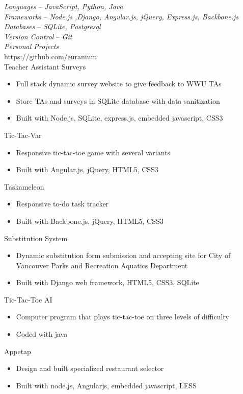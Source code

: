 \documentclass[line,margin]{res}
\begin{document}
\begin{resume}
	{\sl Languages} -- {\sl JavaScript, Python, Java}\\
	{\sl Frameworks} -- {\sl Node.js ,Django, Angular.js, jQuery, Express.js, Backbone.js} \\
	{\sl Databases} -- {\sl SQLite, Postgresql} \\
	{\sl Version Control} -- {\sl Git}\\
	{\sl Personal Projects}\\
	{\footnotesize https://github.com/euranium}\\
	Teacher Assistant Surveys
	\begin{itemize} \itemsep -2pt
		\item Full stack dynamic survey website to give feedback to WWU TAs
		\item Store TAs and surveys in SQLite database with data sanitization
		\item Built with Node.js, SQLite, express.js, embedded javascript, CSS3
	\end{itemize}
	Tic-Tac-Var
	\begin{itemize} \itemsep -2pt
		\item Responsive tic-tac-toe game with several variants
		\item Built with Angular.js, jQuery, HTML5, CSS3
	\end{itemize}
	Taskameleon
	\begin{itemize} \itemsep -2pt
		\item Responsive to-do task tracker
		\item Built with Backbone.js, jQuery, HTML5, CSS3 
	\end{itemize}
	Substitution System
	\begin{itemize} \itemsep -2pt
		\item Dynamic substitution form submission and accepting site for City of Vancouver Parks and Recreation Aquatics Department
		\item Built with Django web framework, HTML5, CSS3, SQLite
	\end{itemize}
	Tic-Tac-Toe AI
	\begin{itemize} \itemsep -2pt
		\item Computer program that plays tic-tac-toe on three levels of difficulty
		\item Coded with java
	\end{itemize}
	Appetap
	\begin{itemize} \itemsep -2pt
		\item Design and built specialized restaurant selector 
		\item Built with node.js, Angularjs, embedded javascript, LESS
	\end{itemize}


\end{resume}
\end{document}
